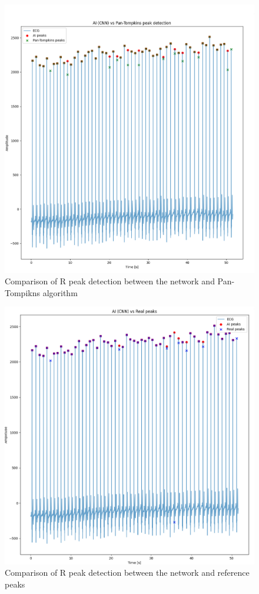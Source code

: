 \documentclass[journal]{IEEEtran}
\begin{document}
\begin{figure}[htbp]
    \centering
    \includegraphics[scale=0.2]{ai_pan-tompkins.png}
    \caption{Comparison of R peak detection between the network and Pan-Tompikns algorithm}
    \label{fig:ai_pan-tompkins}
\end{figure}

\begin{figure}[htbp]
    \centering
    \includegraphics[scale=0.2]{ai_real_peaks.png}
    \caption{Comparison of R peak detection between the network and reference peaks}
    \label{fig:ai_real_peaks}
\end{figure}
\end{document}
